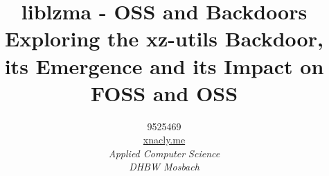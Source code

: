 

\title{liblzma - OSS and Backdoors\\\large Exploring the xz-utils
Backdoor, its Emergence and its Impact on FOSS and OSS}
\author{9525469\\\href{https://xnacly.me}{xnacly.me}\\\small\textit{Applied Computer Science}\\\small\textit{DHBW Mosbach}}


    \maketitle
    
    
    
    
    
    \printbibliography

    


